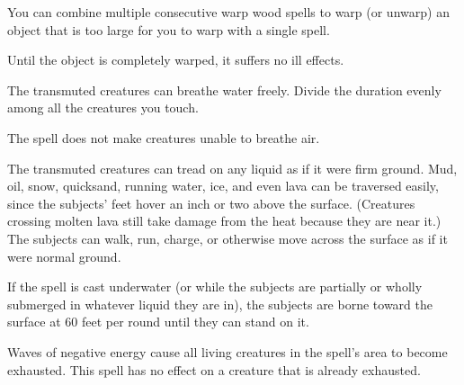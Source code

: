 \begin{multicols}{2}
\begin{small}
\smallskip\noindent You can combine multiple consecutive warp wood spells to warp (or unwarp) an object that is too large for you to warp with a single spell. 

\smallskip\noindent Until the object is completely warped, it suffers no ill effects.

\noindent The transmuted creatures can breathe water freely. Divide the duration evenly among all the creatures you touch.

\smallskip\noindent The spell does not make creatures unable to breathe air.


\noindent The transmuted creatures can tread on any liquid as if it were firm ground. Mud, oil, snow, quicksand, running water, ice, and even lava can be traversed easily, since the subjects' feet hover an inch or two above the surface. (Creatures crossing molten lava still take damage from the heat because they are near it.) The subjects can walk, run, charge, or otherwise move across the surface as if it were normal ground.

\smallskip\noindent If the spell is cast underwater (or while the subjects are partially or wholly submerged in whatever liquid they are in), the subjects are borne toward the surface at 60 feet per round until they can stand on it.

\noindent Waves of negative energy cause all living creatures in the spell's area to become exhausted. This spell has no effect on a creature that is already exhausted.


\end{small}
\end{multicols}
